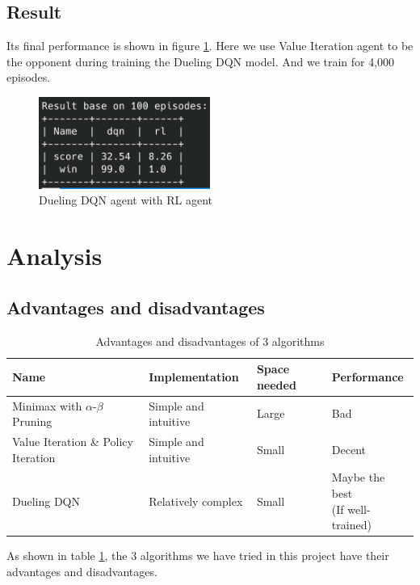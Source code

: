 \documentclass{article}
\begin{document}
\subsection{Result}
Its final performance is shown in figure \ref{dqn-rl}. Here we use Value Iteration agent to be the opponent during training the Dueling DQN model. And we train for 4,000 episodes.

\begin{figure}[H]
  \centering
  \includegraphics[width=0.5\textwidth]{figs/dqn_vs_rl.png}
  \caption{Dueling DQN agent with RL agent}
  \label{dqn-rl}
\end{figure}

\section{Analysis}

\subsection{Advantages and disadvantages}

\begin{table}[H]
  \caption{Advantages and disadvantages of 3 algorithms}
  \label{pros-cons}
  \centering
  \begin{tabular}{llll}
    \toprule
    Name & Implementation & Space needed & Performance \\
    \midrule
    Minimax with $\alpha$-$\beta$ Pruning & Simple and intuitive & Large & Bad \\
    Value Iteration \& Policy Iteration & Simple and intuitive & Small & Decent \\
    Dueling DQN     & Relatively complex & Small & \makecell{Maybe the best \\ (If well-trained)} \\
    \bottomrule
  \end{tabular}
\end{table}

As shown in table \ref{pros-cons}, the 3 algorithms we have tried in this project have their advantages and disadvantages. 
\end{document}
